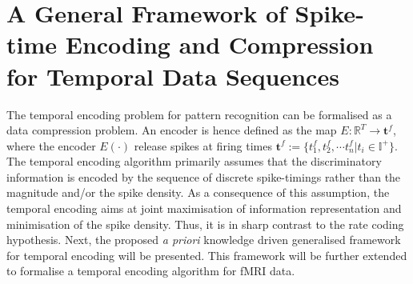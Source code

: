 \section{A General Framework of Spike-time Encoding and Compression for Temporal Data Sequences}
\label{sec:general}

The temporal encoding problem for pattern recognition can be formalised as a data compression problem. An encoder is hence defined as the map $\displaystyle E:\mathbb{R}^T\rightarrow\mathbf{t}^f$, where the encoder $\displaystyle E(\cdot)$ release spikes at firing times $\displaystyle \mathbf{t}^f:=\{t_1^f, t_2^f,\cdots t_n^f|t_i\in \mathbb{I}^+\}$. The temporal encoding algorithm primarily assumes that the discriminatory information is encoded by the sequence of discrete spike-timings rather than the magnitude and/or the spike density. As a consequence of this assumption, the temporal encoding aims at joint maximisation of information representation and minimisation of the spike density. Thus, it is in sharp contrast to the rate coding hypothesis. Next, the proposed \emph{a priori} knowledge driven generalised framework for temporal encoding will be presented. This framework will be further extended to formalise a temporal encoding algorithm for fMRI data.

